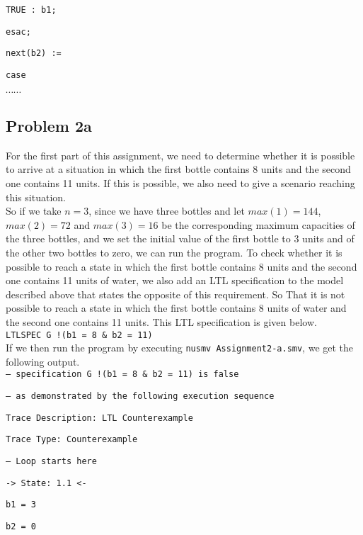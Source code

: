 \documentclass[a4paper]{article}
\begin{document}
{{\tt 		TRUE : b1; }

{\tt 	esac; }

\vspace{1em}

{\tt next(b2) := }

{\tt 	case }

$\cdots \cdots$

	
	\subsection*{Problem 2a}
	For the first part of this assignment, we need to determine whether it is possible to arrive at a situation in which the first bottle contains 8 units and the second one contains 11 units. If this is possible, we also need to give a scenario reaching this situation.\\
	
	So if we take $n=3$, since we have three bottles and let $max(1)=144$, $max(2)=72$ and $max(3)=16$ be the corresponding maximum capacities of the three bottles, and we set the initial value of the first bottle to 3 units and of the other two bottles to zero, we can run the program. To check whether it is possible to reach a state in which the first bottle contains 8 units and the second one contains 11 units of water, we also add an LTL specification to the model described above that states the opposite of this requirement. So That it is not possible to reach a state in which the first bottle contains 8 units of water and the second one contains 11 units. This LTL specification is given below.\\

{\tt LTLSPEC G !(b1 = 8 \& b2 = 11) }\\

If we then run the program by executing {\tt nusmv Assignment2-a.smv}, we get the following output.\\

{\tt -- specification  G !(b1 = 8 \& b2 = 11)  is false }

{\tt -- as demonstrated by the following execution sequence }

{\tt Trace Description: LTL Counterexample }

{\tt Trace Type: Counterexample }

{\tt   -- Loop starts here }

{\tt   -> State: 1.1 <- }

{\tt     b1 = 3 }

{\tt     b2 = 0 }

}
\end{document}
